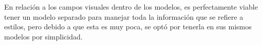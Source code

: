 En relación a los campos visuales dentro de los modelos, es perfectamente viable tener un modelo separado para manejar toda la información que se refiere a estilos, pero debido a que esta es muy poca, se optó por tenerla en sus mismos modelos por simplicidad.


